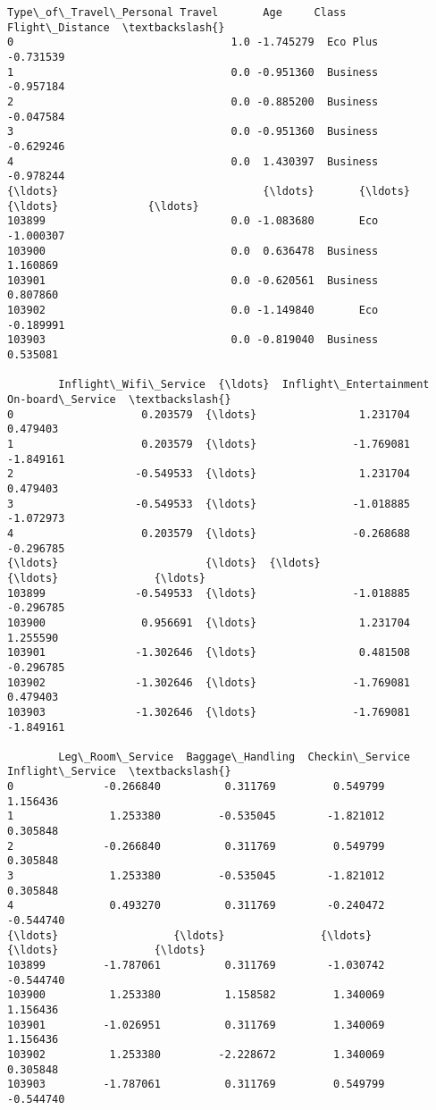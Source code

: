 \documentclass[11pt]{article}
\begin{document}
\begin{tcolorbox}[breakable, size=fbox, boxrule=.5pt, pad at break*=1mm, opacityfill=0]
\begin{Verbatim}[commandchars=\\\{\}]
        Type\_of\_Travel\_Personal Travel       Age     Class  Flight\_Distance  \textbackslash{}
0                                  1.0 -1.745279  Eco Plus        -0.731539
1                                  0.0 -0.951360  Business        -0.957184
2                                  0.0 -0.885200  Business        -0.047584
3                                  0.0 -0.951360  Business        -0.629246
4                                  0.0  1.430397  Business        -0.978244
{\ldots}                                {\ldots}       {\ldots}       {\ldots}              {\ldots}
103899                             0.0 -1.083680       Eco        -1.000307
103900                             0.0  0.636478  Business         1.160869
103901                             0.0 -0.620561  Business         0.807860
103902                             0.0 -1.149840       Eco        -0.189991
103903                             0.0 -0.819040  Business         0.535081

        Inflight\_Wifi\_Service  {\ldots}  Inflight\_Entertainment  On-board\_Service  \textbackslash{}
0                    0.203579  {\ldots}                1.231704          0.479403
1                    0.203579  {\ldots}               -1.769081         -1.849161
2                   -0.549533  {\ldots}                1.231704          0.479403
3                   -0.549533  {\ldots}               -1.018885         -1.072973
4                    0.203579  {\ldots}               -0.268688         -0.296785
{\ldots}                       {\ldots}  {\ldots}                     {\ldots}               {\ldots}
103899              -0.549533  {\ldots}               -1.018885         -0.296785
103900               0.956691  {\ldots}                1.231704          1.255590
103901              -1.302646  {\ldots}                0.481508         -0.296785
103902              -1.302646  {\ldots}               -1.769081          0.479403
103903              -1.302646  {\ldots}               -1.769081         -1.849161

        Leg\_Room\_Service  Baggage\_Handling  Checkin\_Service  Inflight\_Service  \textbackslash{}
0              -0.266840          0.311769         0.549799          1.156436
1               1.253380         -0.535045        -1.821012          0.305848
2              -0.266840          0.311769         0.549799          0.305848
3               1.253380         -0.535045        -1.821012          0.305848
4               0.493270          0.311769        -0.240472         -0.544740
{\ldots}                  {\ldots}               {\ldots}              {\ldots}               {\ldots}
103899         -1.787061          0.311769        -1.030742         -0.544740
103900          1.253380          1.158582         1.340069          1.156436
103901         -1.026951          0.311769         1.340069          1.156436
103902          1.253380         -2.228672         1.340069          0.305848
103903         -1.787061          0.311769         0.549799         -0.544740


\end{Verbatim}
\end{tcolorbox}
\end{document}
